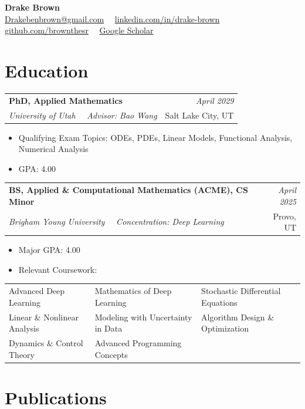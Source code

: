 \documentclass[letterpaper,11pt]{article}
\makeatletter
\newcommand{\entry}[4]{%
  \noindent\begin{tabularx}{\textwidth}{@{}X r@{}}
    \textbf{#1} & \textit{#2} \\
    \textit{#3} & #4 \\
  \end{tabularx}\vspace{2pt}
}
\makeatother
\begin{document}
\begin{center}
  {\LARGE \textbf{Drake Brown}}\\[2pt]
  \href{mailto:Drakebenbrown@gmail.com}{Drakebenbrown@gmail.com} \, \textbar\, \href{https://www.linkedin.com/in/drake-brown-5398b9224}{linkedin.com/in/drake-brown} \, \textbar\, \href{https://github.com/brownthesr}{github.com/brownthesr} \, \textbar\, \href{https://scholar.google.com/citations?user=BEqMd74AAAAJ}{Google Scholar}
\end{center}

\section*{Education}

\entry{PhD, Applied Mathematics}{April 2029}
      {University of Utah \, \textbullet\, Advisor: Bao Wang}{Salt Lake City, UT}
\vspace{-4pt}
\begin{itemize}
  \item Qualifying Exam Topics: ODEs, PDEs, Linear Models, Functional Analysis, Numerical Analysis
  \item GPA: 4.00
\end{itemize}

\entry{BS, Applied \& Computational Mathematics (ACME), CS Minor}{April 2025}
      {Brigham Young University \, \textbullet\, Concentration: Deep Learning}{Provo, UT}
\vspace{-4pt}
\begin{itemize}
  \item Major GPA: 4.00
  \item Relevant Coursework:
\end{itemize}
\vspace{-8pt}
\noindent\begin{tabularx}{\textwidth}{XXX}
  Advanced Deep Learning      & Mathematics of Deep Learning      & Stochastic Differential Equations \\
  Linear \& Nonlinear Analysis & Modeling with Uncertainty in Data & Algorithm Design \& Optimization \\
  Dynamics \& Control Theory   & Advanced Programming Concepts     & \\
\end{tabularx}

\section*{Publications}
\end{document}
